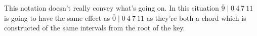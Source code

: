 \documentclass[preview]{standalone}
\begin{document}
\begin{center}
This notation doesn't really convey what's going on. In this situation $ \overline{9} \mid 0 \ 4 \ 7 \ 11$ is going to have the same effect as $ \overline{0} \mid 0 \ 4 \ 7 \ 11$ as they're both a chord which is constructed of the same intervals from the root of the key.
\end{center}
\end{document}
